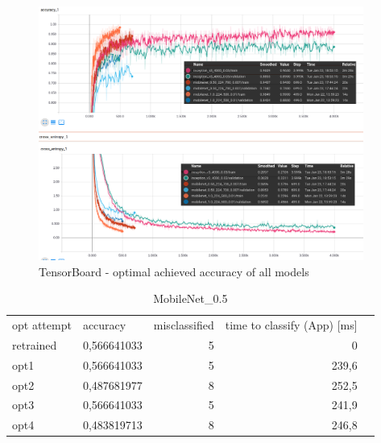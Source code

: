 \begin{figure}[htbp]
\centering
\includegraphics[width=0.95\textwidth]{includes/AllRes}
\caption{TensorBoard - optimal achieved accuracy of all models}
\label{fig:AllRes}
\end{figure}

\newpage




\begin{table}[]
\centering
\begin{tabular}{|l|r|r|r|l}
\cline{1-4}
opt attempt & \multicolumn{1}{l|}{accuracy} & \multicolumn{1}{l|}{misclassified} & \multicolumn{1}{l|}{time to classify (App) {[}ms{]}} &  \\ \cline{1-4}
retrained & 0,566641033                   & 5                                           & 0                                &  \\ \cline{1-4}
opt1      & 0,566641033                   & 5                                           & 239,6                           &  \\ \cline{1-4}
opt2      & 0,487681977                   & 8                                           & 252,5                           &  \\ \cline{1-4}
opt3      & 0,566641033                   & 5                                           & 241,9                   &  \\ \cline{1-4}
opt4      & 0,483819713                   & 8                                           & 246,8                            &  \\ \cline{1-4}
\end{tabular}
\caption{MobileNet_0.5}
\label{tab:mobileNet05}
\end{table}

